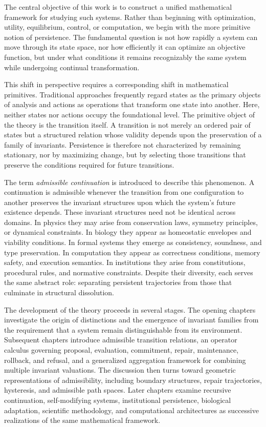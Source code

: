 \documentclass[11pt]{book}
\numberwithin{equation}{chapter}
\theoremstyle{definition}
\theoremstyle{plain}
\begin{document}
The central objective of this work is to construct a unified mathematical framework for studying such systems. Rather than beginning with optimization, utility, equilibrium, control, or computation, we begin with the more primitive notion of persistence. The fundamental question is not how rapidly a system can move through its state space, nor how efficiently it can optimize an objective function, but under what conditions it remains recognizably the same system while undergoing continual transformation.

This shift in perspective requires a corresponding shift in mathematical primitives. Traditional approaches frequently regard states as the primary objects of analysis and actions as operations that transform one state into another. Here, neither states nor actions occupy the foundational level. The primitive object of the theory is the transition itself. A transition is not merely an ordered pair of states but a structured relation whose validity depends upon the preservation of a family of invariants. Persistence is therefore not characterized by remaining stationary, nor by maximizing change, but by selecting those transitions that preserve the conditions required for future transitions.

The term \emph{admissible continuation} is introduced to describe this phenomenon. A continuation is admissible whenever the transition from one configuration to another preserves the invariant structures upon which the system's future existence depends. These invariant structures need not be identical across domains. In physics they may arise from conservation laws, symmetry principles, or dynamical constraints. In biology they appear as homeostatic envelopes and viability conditions. In formal systems they emerge as consistency, soundness, and type preservation. In computation they appear as correctness conditions, memory safety, and execution semantics. In institutions they arise from constitutions, procedural rules, and normative constraints. Despite their diversity, each serves the same abstract role: separating persistent trajectories from those that culminate in structural dissolution.

The development of the theory proceeds in several stages. The opening chapters investigate the origin of distinctions and the emergence of invariant families from the requirement that a system remain distinguishable from its environment. Subsequent chapters introduce admissible transition relations, an operator calculus governing proposal, evaluation, commitment, repair, maintenance, rollback, and refusal, and a generalized aggregation framework for combining multiple invariant valuations. The discussion then turns toward geometric representations of admissibility, including boundary structures, repair trajectories, hysteresis, and admissible path spaces. Later chapters examine recursive continuation, self-modifying systems, institutional persistence, biological adaptation, scientific methodology, and computational architectures as successive realizations of the same mathematical framework.
\end{document}
